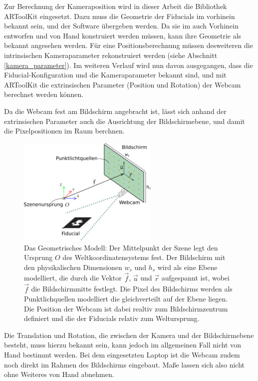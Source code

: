    Zur Berechnung der Kameraposition wird in dieser Arbeit die Bibliothek ARToolKit \cite{artoolkit} eingesetzt. 
   Dazu muss die Geometrie der Fiducials im vorhinein bekannt sein, und der Software übergeben werden.
   Da sie im auch Vorhinein entworfen und von Hand konstruiert werden müssen, kann ihre Geometrie als bekannt angesehen werden.
   Für eine Positionsberechnung müssen desweiteren die intrinsischen Kameraparameter rekonstruiert werden (siehe Abschnitt \ref{kamera_parameter}).
   Im weiteren Verlauf wird nun davon ausgegangen, dass die Fiducial-Konfiguration und die Kameraparameter bekannt sind, und mit ARToolKit 
   die extrinsischen Parameter (Position und Rotation) der Webcam berechnet werden können.
   
   Da die Webcam fest am Bildschirm angebracht ist, lässt sich anhand der extrinsischen Parameter auch die Ausrichtung der Bildschirmebene, und damit die Pixelpositionen im Raum berchnen.
      \begin{figure}[h]
    \centering
    \includegraphics[width=0.6\textwidth]{../graphics/kalibrierung/geometric.svg}
    \caption[Geometrisches Modell]{ 
               Das Geometrisches Modell:
               Der Mittelpunkt der Szene legt den Ursprung $O$ des Weltkoordinatensystems fest. 
               Der Bildschirm mit den physikalischen Dimensionen $w_s$ und $h_s$ wird als eine Ebene modelliert, die durch die Vektor $\vec{f}$, $\vec{u}$ und $\vec{r}$ aufgespannt ist, wobei $\vec{f}$ die Bildschirmmitte festlegt.
               Die Pixel des Bildschirms werden als Punktlichquellen modelliert die gleichverteilt auf der Ebene liegen.
               Die Position der Webcam ist dabei realtiv zum Bildschirmzentrum definiert und die der Fiducials relativ zum Weltursprung. 
           }
    \label{fig:geometric_model}
   \end{figure}
    
    Die Translation und Rotation, die zwischen der Kamera und der Bildschirmebene besteht, muss hierzu bekannt sein, kann jedoch im allgemeinen Fall nicht von Hand bestimmt werden.
    Bei dem eingesetzten Laptop ist die Webcam zudem noch direkt im Rahmen des Bildschirms eingebaut. Maße lassen sich also nicht ohne Weiteres von Hand abnehmen.
    
